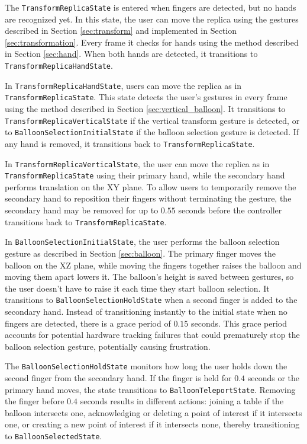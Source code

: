     The \lstinline{TransformReplicaState} is entered when fingers are detected, but no hands are recognized yet. In this state, the user can move the replica using the gestures described in Section \ref{sec:transform} and implemented in Section \ref{sec:transformation}. Every frame it checks for hands using the method described in Section \ref{sec:hand}. When both hands are detected, it transitions to \lstinline{TransformReplicaHandState}.
    
    In \lstinline{TransformReplicaHandState}, users can move the replica as in \lstinline{TransformReplicaState}. This state detects the user's gestures in every frame using the method described in Section \ref{sec:vertical_balloon}. It transitions to \lstinline{TransformReplicaVerticalState} if the vertical transform gesture is detected, or to \lstinline{BalloonSelectionInitialState} if the balloon selection gesture is detected. If any hand is removed, it transitions back to \lstinline{TransformReplicaState}.

    In \lstinline{TransformReplicaVerticalState}, the user can move the replica as in \lstinline{TransformReplicaState} using their primary hand, while the secondary hand performs translation on the XY plane. To allow users to temporarily remove the secondary hand to reposition their fingers without terminating the gesture, the secondary hand may be removed for up to $0.55$ seconds before the controller transitions back to \lstinline{TransformReplicaState}.

    In \lstinline{BalloonSelectionInitialState}, the user performs the balloon selection gesture as described in Section \ref{sec:balloon}. The primary finger moves the balloon on the XZ plane, while moving the fingers together raises the balloon and moving them apart lowers it. The balloon's height is saved between gestures, so the user doesn't have to raise it each time they start balloon selection. It transitions to \lstinline{BalloonSelectionHoldState} when a second finger is added to the secondary hand. Instead of transitioning instantly to the initial state when no fingers are detected, there is a grace period of $0.15$ seconds. This grace period accounts for potential hardware tracking failures that could prematurely stop the balloon selection gesture, potentially causing frustration.

    The \lstinline{BalloonSelectionHoldState} monitors how long the user holds down the second finger from the secondary hand. If the finger is held for $0.4$ seconds or the primary hand moves, the state transitions to \lstinline{BalloonTeleportState}. Removing the finger before $0.4$ seconds results in different actions: joining a table if the balloon intersects one, acknowledging or deleting a point of interest if it intersects one, or creating a new point of interest if it intersects none, thereby transitioning to \lstinline{BalloonSelectedState}.

